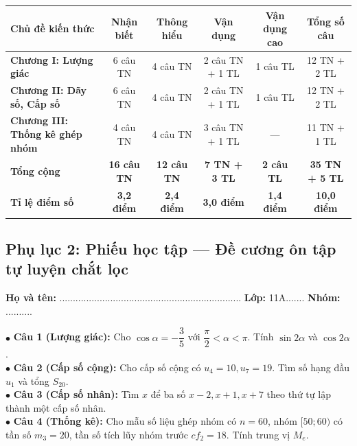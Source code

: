 \documentclass[12pt, a4paper]{article}
\begin{document}
\begin{center}
\begin{tabularx}{\linewidth}{|p{3.5cm}|c|c|c|c|c|}
\hline
\textbf{Chủ đề kiến thức} & \textbf{Nhận biết} & \textbf{Thông hiểu} & \textbf{Vận dụng} & \textbf{Vận dụng cao} & \textbf{Tổng số câu} \\
\hline
\textbf{Chương I: Lượng giác} & 6 câu TN & 4 câu TN & 2 câu TN + 1 TL & 1 câu TL & 12 TN + 2 TL \\
\hline
\textbf{Chương II: Dãy số, Cấp số} & 6 câu TN & 4 câu TN & 2 câu TN + 1 TL & 1 câu TL & 12 TN + 2 TL \\
\hline
\textbf{Chương III: Thống kê ghép nhóm} & 4 câu TN & 4 câu TN & 3 câu TN + 1 TL & --- & 11 TN + 1 TL \\
\hline
\textbf{Tổng cộng} & \textbf{16 câu TN} & \textbf{12 câu TN} & \textbf{7 TN + 3 TL} & \textbf{2 câu TL} & \textbf{35 TN + 5 TL} \\
\hline
\textbf{Tỉ lệ điểm số} & \textbf{3,2 điểm} & \textbf{2,4 điểm} & \textbf{3,0 điểm} & \textbf{1,4 điểm} & \textbf{10,0 điểm} \\
\hline
\end{tabularx}
\end{center}

\subsection*{Phụ lục 2: Phiếu học tập --- Đề cương ôn tập tự luyện chắt lọc}
\noindent\textbf{Họ và tên:} .................................................................... \textbf{Lớp:} 11A....... \textbf{Nhóm:} ..........

\begin{pedabox}
    $\bullet$ \textbf{Câu 1 (Lượng giác):} Cho $\cos\alpha = -\dfrac{3}{5}$ với $\dfrac{\pi}{2} < \alpha < \pi$. Tính $\sin 2\alpha$ và $\cos 2\alpha$.\\
    $\bullet$ \textbf{Câu 2 (Cấp số cộng):} Cho cấp số cộng có $u_4 = 10, u_7 = 19$. Tìm số hạng đầu $u_1$ và tổng $S_{20}$.\\
    $\bullet$ \textbf{Câu 3 (Cấp số nhân):} Tìm $x$ để ba số $x - 2, x + 1, x + 7$ theo thứ tự lập thành một cấp số nhân.\\
    $\bullet$ \textbf{Câu 4 (Thống kê):} Cho mẫu số liệu ghép nhóm có $n = 60$, nhóm $[50; 60)$ có tần số $m_3 = 20$, tần số tích lũy nhóm trước $cf_2 = 18$. Tính trung vị $M_e$.
\end{pedabox}
\end{document}

